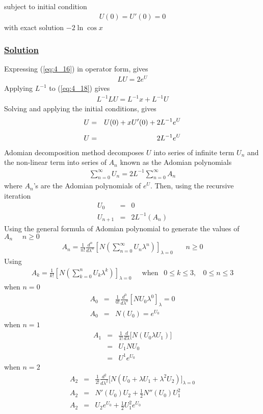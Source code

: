 \documentclass[11pt]{report}
\newcommand{\ubt}[1]{\textbf{\underline{#1}}}
\newcommand{\sps}{\\[0.2cm]}
\newcommand{\refn}[1]{(\ref{#1})}
\newcommand{\refx}[1]{\refn{eq:#1}}
\newcommand{\sprime}{'}
\newcommand{\dprime}{''}
\newcommand{\solution}{\subsubsection{\ubt{Solution}}}
\begin{document}
	subject to initial condition
	\begin{eqnarray}
		U(0)  = U\sprime(0) = 0\label{eq:4_17}
	\end{eqnarray}
	with exact solution $-2\ln\cos x$
	\solution
	Expressing \refx{4_16} in operator form, gives
	\begin{eqnarray}
		LU = 2e^U\label{eq:4_18}
	\end{eqnarray}
	Applying $L^{-1}$ to \refx{4_18} gives
	\begin{eqnarray}
		L^{-1}LU = L^{-1}x + L^{-1}U
	\end{eqnarray}
	Solving and applying the initial conditions, gives
	\begin{eqnarray}
		U &=&U(0) + xU\sprime(0) + 2L^{-1}e^U\notag\sps
		U &=& 2L^{-1}e^U\label{eq:4_20}
	\end{eqnarray}
	Adomian decomposition method decomposes $U$ into series of infinite term $U_n$ and the non-linear term into series of $A_n$ known as the Adomian polynomials
	\begin{eqnarray}
		\sum_{n=0}^\infty U_n = 2L^{-1}\sum_{n=0}^\infty A_n\label{eq:4_21}
	\end{eqnarray}	
	where $A_n$'s are the Adomian polynomials of $e^U$. Then, using the recursive iteration
	\begin{eqnarray*}
		U_0 &=&0 \sps
		U_{n+1} &=& 2L^{-1}(A_n)
	\end{eqnarray*}
	Using the general formula of Adomian polynomial to generate the values of $A_n~~~~~~ n\geq 0$ 
	\begin{eqnarray*}
		A_n = \frac{1}{n!}\frac{d^n}{d\lambda^n}\left[N\left(\sum_{n=0}^\infty U_n\lambda^n\right)\right]_{\lambda=0} ~~~~~~~~ n\geq 0
	\end{eqnarray*}
	Using 
	\begin{eqnarray*}
		A_k = \frac{1}{k!}\left[N\left(\sum_{k=0}^n U_k\lambda^k\right)\right]_{\lambda=0} ~~~~~ \text{ when }~~ 0 \leq k \leq 3, ~~~~ 0 \leq n \leq 3
	\end{eqnarray*}
	when $n=0$
	\begin{eqnarray*}
		A_0 &=&\frac{1}{0!}\frac{d^0}{d\lambda^0}\left[N U_0\lambda^0\right]_\lambda=0\sps
		A_0 &=& N(U_0) = e^{U_0}
	\end{eqnarray*}
	when $n=1$
	\begin{eqnarray*}
		A_1 &=&\frac{1}{1!}\frac{d}{d\lambda}\Big[N (U_0\lambda U_1)\Big]\sps
		&=& U_1NU_0\sps
		&=& U^1e^{U_0}
	\end{eqnarray*}
	when $n=2$
	\begin{eqnarray*}
		A_2 &=&\frac{1}{2!}\frac{d^2}{d\lambda^2}\Big[N (U_0 + \lambda U_1 + \lambda^2U_2)\Big]_{\lambda=0}\sps
		A_2 &=& N\sprime(U_0) U_2 + \frac{1}{2}N\dprime(U_0)U_1^2\sps
		A_2 &=& U_2e^{U_0} + \frac{1}{2}U_1^2e^{U_0}
	\end{eqnarray*}
\end{document}
